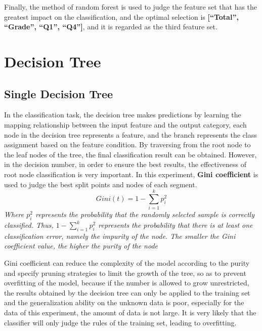 \documentclass[twocolumn]{IEEEtran}
\begin{document}
Finally, the method of random forest is used to judge the feature set that has the greatest impact on the classification, and the optimal selection is \textbf{[``Total'', ``Grade'', ``Q1'', ``Q4'']}, and it is regarded as the third feature set.

\section{Decision Tree}
\subsection{Single Decision Tree}
In the classification task, the decision tree makes predictions by learning the mapping relationship between the input feature and the output category, each node in the decision tree represents a feature, and the branch represents the class assignment based on the feature condition. By traversing from the root node to the leaf nodes of the tree, the final classification result can be obtained. However, in the decision number, in order to ensure the best results, the effectiveness of root node classification is very important. In this experiment, \textbf{Gini coefficient} is used to judge the best split points and nodes of each segment.
\begin{equation}
    Gini(t) = 1 - \sum_{i=1}^k p_i^2
\end{equation}
\textit{Where \(p_i^2 \) represents the probability that the randomly selected sample is correctly classified. Thus, \(1 - \sum_{i=1}^k p_i^2 \) represents the probability that there is at least one classification error, namely the impurity of the node. The smaller the Gini coefficient value, the higher the purity of the node}

Gini coefficient can reduce the complexity of the model according to the purity and specify pruning strategies to limit the growth of the tree, so as to prevent overfitting of the model, because if the number is allowed to grow unrestricted, the results obtained by the decision tree can only be applied to the training set and the generalization ability on the unknown data is poor, especially for the data of this experiment, the amount of data is not large. It is very likely that the classifier will only judge the rules of the training set, leading to overfitting.
\end{document}
